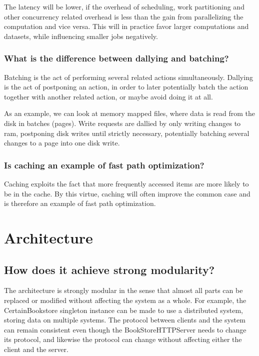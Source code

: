 \documentclass[11pt,a4paper]{article}
\begin{document}
The latency will be lower, if the overhead of scheduling, work partitioning and
other concurrency related overhead is less than the gain from parallelizing the
computation and vice versa. This will in practice favor larger computations and
datasets, while influencing smaller jobs negatively.

\subsubsection{What is the difference between dallying and batching?}

Batching is the act of performing several related actions simultaneously.
Dallying is the act of postponing an action, in order to later potentially batch
the action together with another related action, or maybe avoid doing it at all.

As an example, we can look at memory mapped files, where data is read from the
disk in batches (pages).
Write requests are dallied by only writing changes to ram, postponing disk
writes until strictly necessary, potentially batching several changes to a page
into one disk write.

\subsubsection{Is caching an example of fast path optimization?}

Caching exploits the fact that more frequently accessed items are more likely
to be in the cache. By this virtue, caching will often improve the common case
and is therefore an example of fast path optimization.

\section{Architecture}

\subsection{How does it achieve strong modularity?}
The architecture is strongly modular in the sense that almost all parts can be
replaced or modified without affecting the system as a whole. For example, the
CertainBookstore singleton instance can be made to use a distributed system,
storing data on multiple systems. The protocol between clients and the system
can remain consistent even though the BookStoreHTTPServer needs to change its
protocol, and likewise the protocol can change without affecting either the
client and the server.
\end{document}
